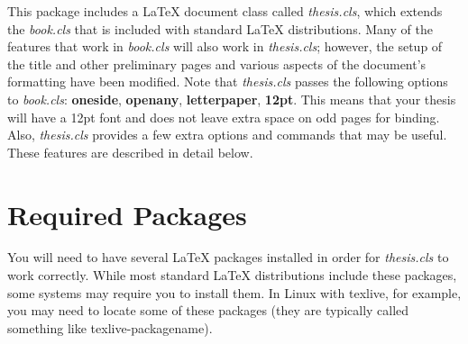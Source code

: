 \documentclass[master]{thesis}
\begin{document}
This package includes a \LaTeX{} document class called \textit{thesis.cls}, which extends the \textit{book.cls} that is included with standard \LaTeX{} distributions.  Many of the features that work in \textit{book.cls} will also work in \textit{thesis.cls}; however, the setup of the title and other preliminary pages and various aspects of the document's formatting have been modified.  Note that \textit{thesis.cls} passes the following options to \textit{book.cls}: \textbf{oneside}, \textbf{openany}, \textbf{letterpaper}, \textbf{12pt}.  This means that your thesis will have a 12pt font and does not leave extra space on odd pages for binding.  Also, \textit{thesis.cls} provides a few extra options and commands that may be useful.  These features are described in detail below.

\section{Required Packages}

You will need to have several \LaTeX{} packages installed in order for \textit{thesis.cls} to work correctly.  While most standard \LaTeX{} distributions include these packages, some systems may require you to install them.  In Linux with texlive, for example, you may need to locate some of these packages (they are typically called something like texlive-packagename).
\end{document}
